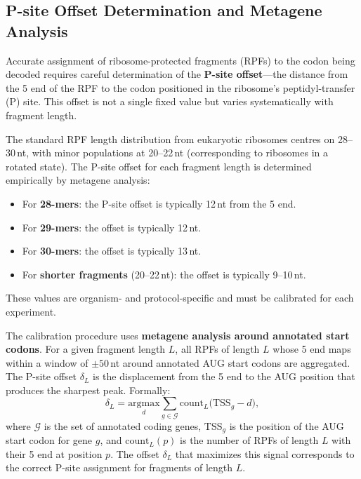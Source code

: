 \subsection{P-site Offset Determination and Metagene Analysis}
\label{subsec:specialized:psite-offset}

Accurate assignment of ribosome-protected fragments (RPFs) to the codon being decoded requires careful determination of the \textbf{P-site offset}---the distance from the 5\textquotesingle{} end of the RPF to the codon positioned in the ribosome's peptidyl-transfer (P) site. This offset is not a single fixed value but varies systematically with fragment length.

\begin{keyconcept}[title={Fragment-Length-Dependent P-site Offsets}]
The standard RPF length distribution from eukaryotic ribosomes centres on 28--30\,nt, with minor populations at 20--22\,nt (corresponding to ribosomes in a rotated state). The P-site offset for each fragment length is determined empirically by metagene analysis:

\begin{itemize}[itemsep=2pt]
  \item For \textbf{28-mers}: the P-site offset is typically 12\,nt from the 5\textquotesingle{} end.
  \item For \textbf{29-mers}: the offset is typically 12\,nt.
  \item For \textbf{30-mers}: the offset is typically 13\,nt.
  \item For \textbf{shorter fragments} (20--22\,nt): the offset is typically 9--10\,nt.
\end{itemize}

These values are organism- and protocol-specific and must be calibrated for each experiment.
\end{keyconcept}

The calibration procedure uses \textbf{metagene analysis around annotated start codons}. For a given fragment length $L$, all RPFs of length $L$ whose 5\textquotesingle{} end maps within a window of $\pm 50$\,nt around annotated AUG start codons are aggregated. The P-site offset $\delta_L$ is the displacement from the 5\textquotesingle{} end to the AUG position that produces the sharpest peak. Formally:
\begin{equation}
  \delta_L = \underset{d}{\text{argmax}} \sum_{g \in \mathcal{G}} \text{count}_{L}\bigl(\text{TSS}_g - d\bigr),
  \label{eq:specialized:psite-offset}
\end{equation}
where $\mathcal{G}$ is the set of annotated coding genes, $\text{TSS}_g$ is the position of the AUG start codon for gene $g$, and $\text{count}_{L}(p)$ is the number of RPFs of length $L$ with their 5\textquotesingle{} end at position $p$. The offset $\delta_L$ that maximizes this signal corresponds to the correct P-site assignment for fragments of length $L$.


